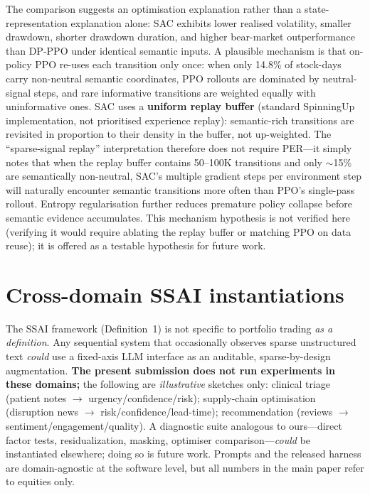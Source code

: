 \documentclass{article}
\begin{document}
The comparison suggests an optimisation explanation rather than a state-representation explanation alone: SAC exhibits lower realised volatility, smaller drawdown, shorter drawdown duration, and higher bear-market outperformance than DP-PPO under identical semantic inputs.
A plausible mechanism is that on-policy PPO re-uses each transition only once: when only 14.8\% of stock-days carry non-neutral semantic coordinates, PPO rollouts are dominated by neutral-signal steps, and rare informative transitions are weighted equally with uninformative ones.
SAC uses a \textbf{uniform replay buffer} (standard SpinningUp implementation, not prioritised experience replay): semantic-rich transitions are revisited in proportion to their density in the buffer, not up-weighted.
The ``sparse-signal replay'' interpretation therefore does not require PER---it simply notes that when the replay buffer contains 50--100K transitions and only $\sim$15\% are semantically non-neutral, SAC's multiple gradient steps per environment step will naturally encounter semantic transitions more often than PPO's single-pass rollout.
Entropy regularisation further reduces premature policy collapse before semantic evidence accumulates.
This mechanism hypothesis is not verified here (verifying it would require ablating the replay buffer or matching PPO on data reuse); it is offered as a testable hypothesis for future work.

\section{Cross-domain SSAI instantiations}
\label{app:generalize}

The SSAI framework (Definition~1) is not specific to portfolio trading \emph{as a definition}.
Any sequential system that occasionally observes sparse unstructured text \emph{could} use a fixed-axis LLM interface as an auditable, sparse-by-design augmentation.
\textbf{The present submission does not run experiments in these domains;} the following are \emph{illustrative} sketches only: clinical triage (patient notes $\rightarrow$ urgency/confidence/risk); supply-chain optimisation (disruption news $\rightarrow$ risk/confidence/lead-time); recommendation (reviews $\rightarrow$ sentiment/engagement/quality).
A diagnostic suite analogous to ours---direct factor tests, residualization, masking, optimiser comparison---\emph{could} be instantiated elsewhere; doing so is future work.
Prompts and the released harness are domain-agnostic at the software level, but all numbers in the main paper refer to equities only.
\end{document}
